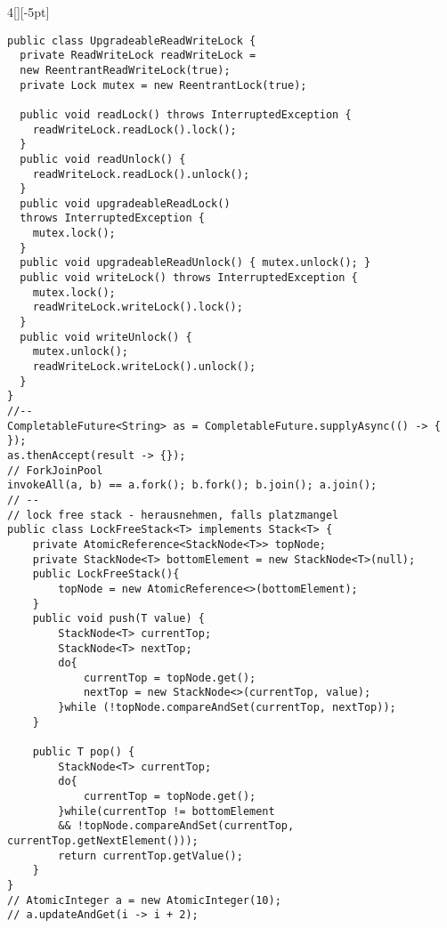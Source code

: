 \documentclass[%
	pdftex,%
	a4paper,%
	landscape,%
	ngerman,
	oneside,%
	6pt,%
	halfparskip,%
]{scrbook}
\begin{document}
\begin{multicols}{4}[][-5pt]
\begin{lstlisting}
public class UpgradeableReadWriteLock {
  private ReadWriteLock readWriteLock = 
  new ReentrantReadWriteLock(true);
  private Lock mutex = new ReentrantLock(true);

  public void readLock() throws InterruptedException {
    readWriteLock.readLock().lock();
  }
  public void readUnlock() {
    readWriteLock.readLock().unlock();
  }
  public void upgradeableReadLock() 
  throws InterruptedException {
    mutex.lock();
  }
  public void upgradeableReadUnlock() { mutex.unlock(); }
  public void writeLock() throws InterruptedException {
    mutex.lock();
    readWriteLock.writeLock().lock();
  }
  public void writeUnlock() {
    mutex.unlock();
    readWriteLock.writeLock().unlock();
  }
}
//--
CompletableFuture<String> as = CompletableFuture.supplyAsync(() -> {
});
as.thenAccept(result -> {});
// ForkJoinPool
invokeAll(a, b) == a.fork(); b.fork(); b.join(); a.join();
// --
// lock free stack - herausnehmen, falls platzmangel
public class LockFreeStack<T> implements Stack<T> {
    private AtomicReference<StackNode<T>> topNode;
    private StackNode<T> bottomElement = new StackNode<T>(null);
    public LockFreeStack(){
        topNode = new AtomicReference<>(bottomElement);
    }
    public void push(T value) {
        StackNode<T> currentTop;
        StackNode<T> nextTop;
        do{
            currentTop = topNode.get();
            nextTop = new StackNode<>(currentTop, value);
        }while (!topNode.compareAndSet(currentTop, nextTop));
    }

    public T pop() {
        StackNode<T> currentTop;
        do{
            currentTop = topNode.get();
        }while(currentTop != bottomElement
        && !topNode.compareAndSet(currentTop, currentTop.getNextElement()));
        return currentTop.getValue();
    }
}
// AtomicInteger a = new AtomicInteger(10);
// a.updateAndGet(i -> i + 2);

\end{lstlisting}


\end{multicols}
\end{document}
